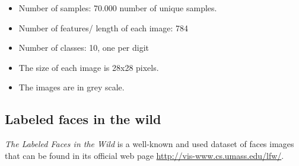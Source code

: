 \begin{itemize}
 \item Number of samples: 70.000 number of unique samples.
 \item Number of features/ length of each image: 784
 \item Number of classes: 10, one per digit
\item The size of each image is 28x28 pixels.
\item The images are in grey scale.
\end{itemize}

\subsection{Labeled faces in the wild}
\textit{The Labeled Faces in the Wild} is a well-known and used dataset of faces images that can be found in its official web page \url{http://vis-www.cs.umass.edu/lfw/}.\\

